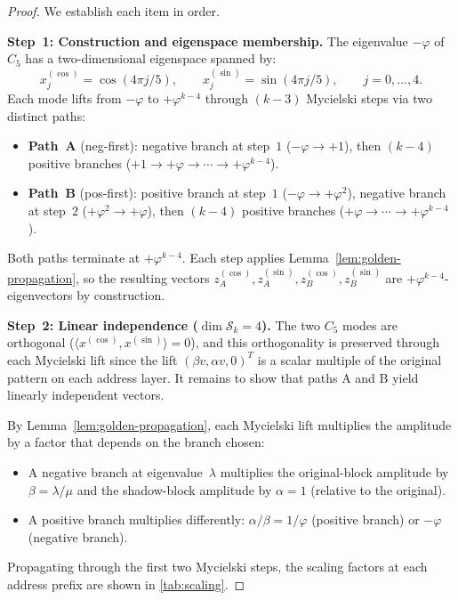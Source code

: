 \documentclass[11pt,a4paper]{amsart}
\theoremstyle{plain}
\theoremstyle{definition}
\theoremstyle{remark}
\newcommand{\vp}{\varphi}
\begin{document}
\begin{proof}
We establish each item in order.

\medskip
\noindent\textbf{Step~1: Construction and eigenspace membership.}
The eigenvalue $-\vp$ of~$C_5$ has a two-dimensional eigenspace spanned by:
\[
  x_j^{(\cos)} = \cos(4\pi j/5),
  \qquad
  x_j^{(\sin)} = \sin(4\pi j/5),
  \qquad j = 0,\ldots,4.
\]
Each mode lifts from $-\vp$ to $+\vp^{k-4}$ through $(k-3)$ Mycielski steps
via two distinct paths:
\begin{itemize}
\item \textbf{Path~A} (neg-first): negative branch at step~$1$
  ($-\vp \to +1$), then $(k-4)$ positive branches
  ($+1 \to +\vp \to \cdots \to +\vp^{k-4}$).
\item \textbf{Path~B} (pos-first): positive branch at step~$1$
  ($-\vp \to +\vp^2$), negative branch at step~$2$
  ($+\vp^2 \to +\vp$), then $(k-4)$ positive branches
  ($+\vp \to \cdots \to +\vp^{k-4}$).
\end{itemize}
Both paths terminate at $+\vp^{k-4}$.  Each step applies
Lemma~\ref{lem:golden-propagation}, so the resulting vectors
$z_A^{(\cos)}, z_A^{(\sin)}, z_B^{(\cos)}, z_B^{(\sin)}$ are
$+\vp^{k-4}$-eigenvectors by construction.

\medskip
\noindent\textbf{Step~2: Linear independence ($\dim \mathcal{S}_k = 4$).}
The two $C_5$ modes are orthogonal ($\langle x^{(\cos)}, x^{(\sin)}\rangle
= 0$), and this orthogonality is preserved through each Mycielski lift since
the lift $(\beta v, \alpha v, 0)^T$ is a scalar multiple of the original
pattern on each address layer.  It remains to show that paths A and B yield
linearly independent vectors.

By Lemma~\ref{lem:golden-propagation}, each Mycielski lift multiplies the
amplitude by a factor that depends on the branch chosen:
\begin{itemize}
\item A negative branch at eigenvalue~$\lambda$ multiplies the original-block
  amplitude by $\beta = \lambda/\mu$ and the shadow-block amplitude by
  $\alpha = 1$ (relative to the original).
\item A positive branch multiplies differently: $\alpha/\beta = 1/\vp$
  (positive branch) or $-\vp$ (negative branch).
\end{itemize}
Propagating through the first two Mycielski steps, the scaling factors at
each address prefix are shown in \cref{tab:scaling}.


\end{proof}
\end{document}
